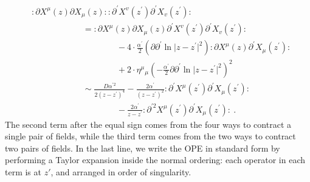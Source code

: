 \begin{align}
	&: \mathrel{\partial X^{\mu}(z) \partial X_{\mu}(z)}: : \mathrel{\partial^{\prime} X^{v}(z^{\prime}) \partial^{\prime} X_{v}(z^{\prime})}: \nonumber \\
	&\qquad \qquad \qquad =: \mathrel{\partial X^{\mu}(z) \partial X_{\mu}(z) \partial^{\prime} X^{v}(z^{\prime}) \partial^{\prime} X_{v}(z^{\prime})}: \nonumber\\
	&\qquad \qquad \qquad \qquad \qquad {-}4 \cdot \frac{\alpha^{\prime}}{2}
	(\partial \partial^{\prime} \ln \lvert z-z^{\prime}\rvert^{2}): \mathrel{\partial X^{\mu}(z) \partial^{\prime} X_{\mu}(z^{\prime})}: \nonumber\\
	&\qquad \qquad \qquad \qquad \qquad {+}2 \cdot \eta^{\mu}{ }_{\mu}\left(-\frac{\alpha^{\prime}}{2} \partial \partial^{\prime}
	\ln \lvert z-z^{\prime}\rvert^{2}\right)^{2} \nonumber\\
	&\qquad \qquad \qquad \sim \frac{D \alpha^{\prime 2}}{2(z-z^{\prime})^{4}}-\frac{2 \alpha^{\prime}}{(z-z^{\prime})^{2}}
	: \mathrel{\partial^{\prime} X^{\mu}(z^{\prime}) \partial^{\prime} X_{\mu}(z^{\prime})}: \nonumber\\
	&\qquad \qquad \qquad \qquad \qquad {-}\frac{2 \alpha^{\prime}}{z-z^{\prime}}: \mathrel{\partial^{\prime 2} X^{\mu}\left(z^{\prime}\right) \partial^{\prime} X_{\mu}\left(z^{\prime}\right)}:\:.
	\label{2.2.11}
\end{align}
The second term after the equal sign comes from the four ways to contract a single pair of fields, while the third term comes from the two ways to contract two pairs of fields. In the last line, we write the OPE in standard form by performing a Taylor expansion inside the normal ordering: each operator in each term is at $z'$, and arranged in order of singularity.    

